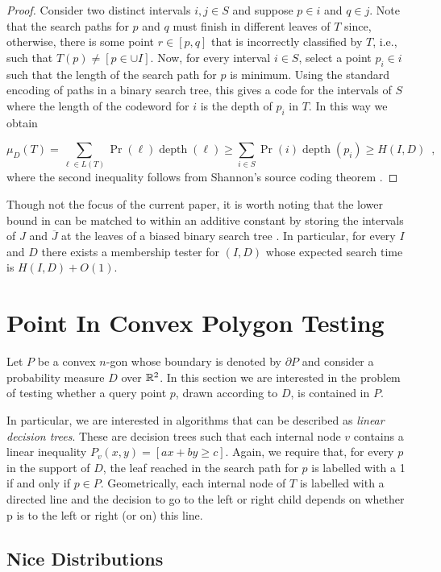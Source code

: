 \documentclass[charterfonts,lotsofwhite]{patmorin}
\DeclareMathOperator{\depth}{depth}
\begin{document}
\begin{proof}
Consider two distinct intervals $i,j\in S$ and suppose $p\in i$ and
$q\in j$.  Note that the search paths for $p$ and $q$ must finish in
different leaves of $T$ since, otherwise, there is some point
$r\in[p,q]$ that is incorrectly classified by $T$, i.e., such
that $T(p)\neq [p\in\cup I]$.  Now, for every interval $i\in S$,
select a point $p_i\in i$ such that the length of the search path for
$p$ is minimum.   Using the standard encoding of paths in a binary
search tree, this gives a code for the intervals of $S$ where the
length of the codeword for $i$ is the depth of $p_i$ in $T$.  In this
way we obtain

\[
   \mu_D(T)
    = \sum_{\ell\in L(T)} \Pr(\ell)\depth(\ell)
   \ge \sum_{i \in S} \Pr(i)\depth(p_i)
   \ge H(I,D)
   \enspace , 
\]
where the second inequality follows from Shannon's source coding
theorem \cite{X}.
\end{proof}

Though not the focus of the current paper, it is worth noting that the
lower bound in  can be matched to within an additive
constant by storing the intervals of $J$ and $\overline{J}$ at the
leaves of a biased binary search tree \cite{kXX,mXX}.  In particular,
for every $I$ and $D$ there exists a membership tester for $(I,D)$
whose expected search time is $H(I,D)+O(1)$.

\section{Point In Convex Polygon Testing}

Let $P$ be a convex $n$-gon whose boundary is denoted by $\partial P$
and consider a probability measure $D$ over $\mathbb{R}^2$.  In this section
we are interested in the problem of testing whether a query point $p$,
drawn according to $D$, is contained in $P$.   

In particular, we are interested in algorithms that can be described
as \emph{linear decision trees}.  These are decision trees such that
each internal node $v$ contains a linear inequality $P_v(x,y)=[ax+by
\ge c]$.  Again, we require that, for every $p$ in the support of $D$,
the leaf reached in the search path for $p$ is labelled with a 1 if
and only if $p\in P$.  Geometrically, each internal node of $T$ is
labelled with a directed line and the decision to go to the left or
right child depends on whether p is to the left or right (or on) this
line.  

\subsection{Nice Distributions}
\end{document}
